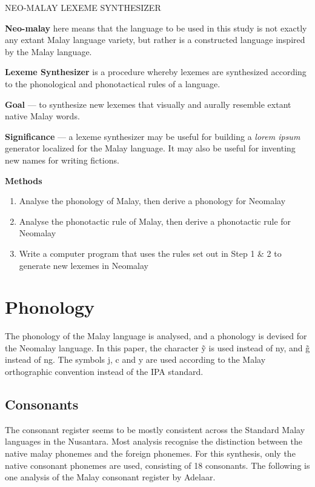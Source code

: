 \documentclass{article}
\newcommand{\grapheme}[1]{\textlangle#1\textrangle}
\begin{document}
\begin{center} {\LARGE NEO-MALAY LEXEME SYNTHESIZER}\bigskip \end{center}

\textbf{Neo-malay} here means that the language to be used in this study is not exactly any extant Malay language variety, but rather is a constructed language inspired by the Malay language.

\textbf{Lexeme Synthesizer} is a procedure whereby lexemes are synthesized according to the phonological and phonotactical rules of a language.

\textbf{Goal} --- to synthesize new lexemes that visually and aurally resemble extant native Malay words.

\textbf{Significance} --- a lexeme synthesizer may be useful for building a \textit{lorem ipsum} generator localized for the Malay language. It may also be useful for inventing new names for writing fictions.

\textbf{Methods}
\begin{enumerate}
	\item Analyse the phonology of Malay, then derive a phonology for Neomalay
	\item Analyse the phonotactic rule of Malay, then derive a phonotactic rule for Neomalay
	\item Write a computer program that uses the rules set out in Step 1 \& 2 to generate new lexemes in Neomalay
\end{enumerate}

\section{Phonology}

The phonology of the Malay language is analysed, and a phonology is devised for the Neomalay language. In this paper, the character \grapheme{\~y} is used instead of \grapheme{ny}, and \grapheme{\~g} instead of \grapheme{ng}. The symbols \grapheme{j}, \grapheme{c} and \grapheme{y} are used according to the Malay orthographic convention instead of the IPA standard.

\subsection{Consonants}

The consonant register seems to be mostly consistent across the Standard Malay languages in the Nusantara. Most analysis recognise the distinction between the native malay phonemes and the foreign phonemes. For this synthesis, only the native consonant phonemes are used, consisting of 18 consonants. The following is one analysis of the Malay consonant register by Adelaar.
\end{document}

